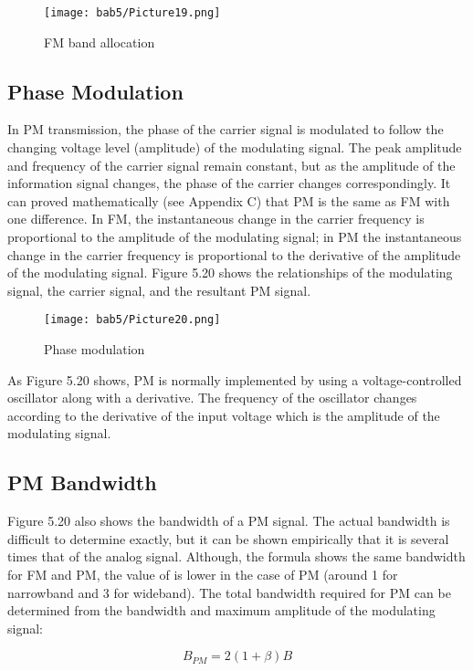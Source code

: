 \begin{figure}
  \centering
  \texttt{[image: bab5/Picture19.png]}
  \caption{FM band allocation}
  \label{fig5:19}
\end{figure}

\subsection{Phase Modulation}
In PM transmission, the phase of the carrier signal is modulated to follow the changing voltage level (amplitude) of the modulating signal. The peak amplitude and frequency of the carrier signal remain constant, but as the amplitude of the information signal changes, the phase of the carrier changes correspondingly. It can proved mathematically (see Appendix C) that PM is the same as FM with one difference. In FM, the instantaneous change in the carrier frequency is proportional to the amplitude of the modulating signal; in PM the instantaneous change in the carrier frequency is proportional to the derivative of the amplitude of the modulating signal. Figure 5.20 shows the relationships of the modulating signal, the carrier signal, and the resultant PM signal.

\begin{figure}
  \centering
  \texttt{[image: bab5/Picture20.png]}
  \caption{Phase modulation}
  \label{fig5:20}
\end{figure}

As Figure 5.20 shows, PM is normally implemented by using a voltage-controlled oscillator along with a derivative. The frequency of the oscillator changes according to the derivative of the input voltage which is the amplitude of the modulating signal.

\subsection*{PM Bandwidth}
Figure 5.20 also shows the bandwidth of a PM signal. The actual bandwidth is difficult to determine exactly, but it can be shown empirically that it is several times that of the analog signal. Although, the formula shows the same bandwidth for FM and PM, the value of is lower in the case of PM (around 1 for narrowband and 3 for wideband). The total bandwidth required for PM can be determined from the bandwidth and maximum amplitude of the modulating signal:

\begin{equation}
  B_{PM} = 2(1 + \beta)B
\end{equation}


